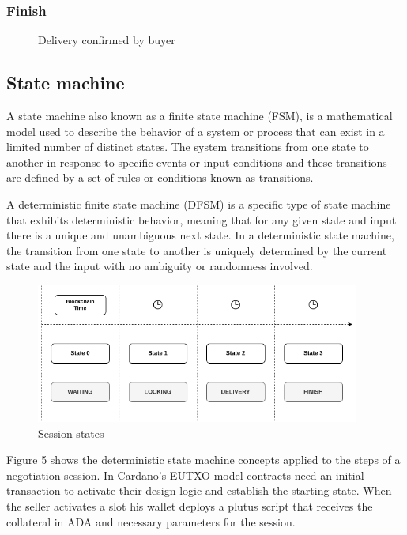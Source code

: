 \documentclass[12pt]{article}
\begin{document}
\subsubsection { Finish }

\begin{figure}[ht]
  \centering
  
  \caption{Delivery confirmed by buyer}
  \label{fig:delivered}
\end{figure}




\subsection { State machine }

A state machine also known as a finite state machine (FSM), is a mathematical model used to describe the behavior of a system or process that can exist in a limited number of distinct states. The system transitions from one state to another in response to specific events or input conditions and these transitions are defined by a set of rules or conditions known as transitions.

A deterministic finite state machine (DFSM) is a specific type of state machine that exhibits deterministic behavior, meaning that for any given state and input there is a unique and unambiguous next state. In a deterministic state machine, the transition from one state to another is uniquely determined by the current state and the input with no ambiguity or randomness involved.

\begin{figure}[ht]
  \centering
  \includegraphics[width=0.95\textwidth]{machine.png}
  \caption{Session states}
  \label{fig:States}
\end{figure}

Figure 5 shows the deterministic state machine concepts applied to the steps of a negotiation session. 
In Cardano's EUTXO model contracts need an initial transaction to activate their design logic and establish the starting state.
When the seller activates a slot his wallet deploys a plutus script that receives the collateral in ADA and necessary parameters for the session. 
\\
\end{document}
